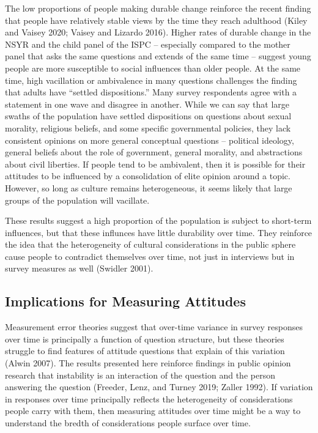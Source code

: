 \documentclass[12pt,]{article}
\begin{document}
The low proportions of people making durable change reinforce the recent finding that people have relatively stable views by the time they reach adulthood (Kiley and Vaisey 2020; Vaisey and Lizardo 2016). Higher rates of durable change in the NSYR and the child panel of the ISPC -- especially compared to the mother panel that asks the same questions and extends of the same time -- suggest young people are more susceptible to social influences than older people. At the same time, high vacillation or ambivalence in many questions challenges the finding that adults have ``settled dispositions.'' Many survey respondents agree with a statement in one wave and disagree in another. While we can say that large swaths of the population have settled dispositions on questions about sexual morality, religious beliefs, and some specific governmental policies, they lack consistent opinions on more general conceptual questions -- political ideology, general beliefs about the role of government, general morality, and abstractions about civil liberties. If people tend to be ambivalent, then it is possible for their attitudes to be influenced by a consolidation of elite opinion around a topic. However, so long as culture remains heterogeneous, it seems likely that large groups of the population will vacillate.

These results suggest a high proportion of the population is subject to short-term influences, but that these influnces have little durability over time. They reinforce the idea that the heterogeneity of cultural considerations in the public sphere cause people to contradict themselves over time, not just in interviews but in survey measures as well (Swidler 2001).

\hypertarget{implications-for-measuring-attitudes}{%
\subsection{Implications for Measuring Attitudes}\label{implications-for-measuring-attitudes}}

Measurement error theories suggest that over-time variance in survey responses over time is principally a function of question structure, but these theories struggle to find features of attitude questions that explain of this variation (Alwin 2007). The results presented here reinforce findings in public opinion research that instability is an interaction of the question and the person answering the question (Freeder, Lenz, and Turney 2019; Zaller 1992). If variation in responses over time principally reflects the heterogeneity of considerations people carry with them, then measuring attitudes over time might be a way to understand the bredth of considerations people surface over time.
\end{document}
